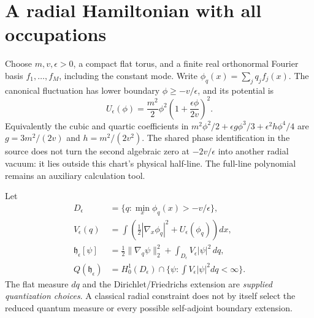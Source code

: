 \documentclass[11pt]{article}
\begin{document}
\section{A radial Hamiltonian with all occupations}
Choose $m,v,\epsilon>0$, a compact flat torus, and a finite real
orthonormal Fourier basis $f_1,\ldots,f_M$, including the constant mode.
Write $\phi_q(x)=\sum_jq_jf_j(x)$. The canonical fluctuation has lower
boundary $\phi\ge-v/\epsilon$, and its potential is
\begin{equation}
 U_\epsilon(\phi)=\frac{m^2}{2}\phi^2
       \left(1+\frac{\epsilon\phi}{2v}\right)^2.
 \label{eq:potential}
\end{equation}
Equivalently the cubic and quartic coefficients in
$m^2\phi^2/2+\epsilon g\phi^3/3+\epsilon^2h\phi^4/4$ are
$g=3m^2/(2v)$ and $h=m^2/(2v^2)$. The shared phase identification in the
source does not turn the second algebraic zero at $-2v/\epsilon$ into
another radial vacuum: it lies outside this chart's physical half-line.
The full-line polynomial remains an auxiliary calculation tool.

Let
\begin{align}
 D_\epsilon&=\{q:\min_x\phi_q(x)>-v/\epsilon\},\\
 V_\epsilon(q)&=\int\left(\tfrac12|\nabla_x\phi_q|^2+
                         U_\epsilon(\phi_q)\right)dx,\\
 \mathfrak h_\epsilon[\psi]&=
 \tfrac12\|\nabla_q\psi\|_2^2+\int_{D_\epsilon}V_\epsilon|\psi|^2\,dq,
 \label{eq:form}\\
 Q(\mathfrak h_\epsilon)&=H_0^1(D_\epsilon)\cap
              \{\psi:\int V_\epsilon|\psi|^2dq<\infty\}.
\end{align}
The flat measure $dq$ and the Dirichlet/Friedrichs extension are
\emph{supplied quantization choices}. A classical radial constraint does
not by itself select the reduced quantum measure or every possible
self-adjoint boundary extension.
\end{document}
